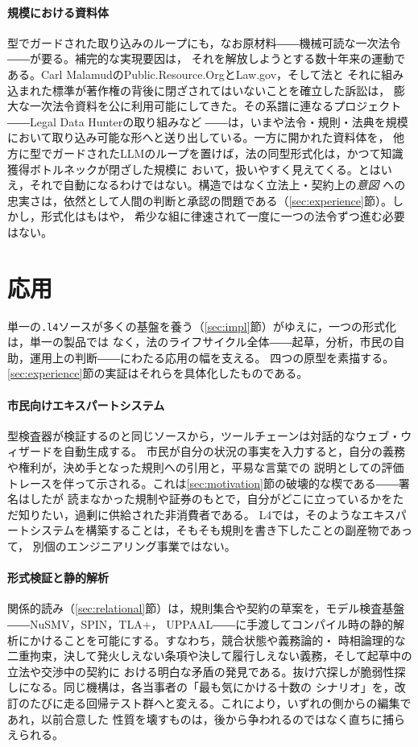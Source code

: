 \documentclass[11pt,a4paper]{ltjsarticle}
\newcommand{\code}[1]{\texttt{\small #1}}
\begin{document}
\paragraph{規模における資料体}
型でガードされた取り込みのループにも，なお原材料――機械可読な一次法令――が要る。補完的な実現要因は，
それを解放しようとする数十年来の運動である。Carl MalamudのPublic.Resource.OrgとLaw.gov，そして法と
それに組み込まれた標準が著作権の背後に閉ざされてはいないことを確立した訴訟\cite{publicresource}は，
膨大な一次法令資料を公に利用可能にしてきた。その系譜に連なるプロジェクト――Legal Data Hunterの取り組みなど
――は，いまや法令・規則・法典を規模において取り込み可能な形へと送り出している。一方に開かれた資料体を，
他方に型でガードされたLLMのループを置けば，法の同型形式化は，かつて知識獲得ボトルネックが閉ざした規模に
おいて，扱いやすく見えてくる。とはいえ，それで自動になるわけではない。構造ではなく立法上・契約上の\emph{意図}
への忠実さは，依然として人間の判断と承認の問題である（\ref{sec:experience}節）。しかし，形式化はもはや，
希少な組に律速されて一度に一つの法令ずつ進む必要はない。

\section{応用}\label{sec:apps}
単一の\code{.l4}ソースが多くの基盤を養う（\ref{sec:impl}節）がゆえに，一つの形式化は，単一の製品では
なく，法のライフサイクル全体――起草，分析，市民の自助，運用上の判断――にわたる応用の幅を支える。
四つの原型を素描する。\ref{sec:experience}節の実証はそれらを具体化したものである。

\paragraph{市民向けエキスパートシステム}
型検査器が検証するのと同じソースから，ツールチェーンは対話的なウェブ・ウィザードを自動生成する。
市民が自分の状況の事実を入力すると，自分の義務や権利が，決め手となった規則への引用と，平易な言葉での
説明としての評価トレースを伴って示される。これは\ref{sec:motivation}節の破壊的な楔である――署名はしたが
読まなかった規制や証券のもとで，自分がどこに立っているかをただ知りたい，過剰に供給された非消費者である。
L4では，そのようなエキスパートシステムを構築することは，そもそも規則を書き下したことの副産物であって，
別個のエンジニアリング事業ではない。

\paragraph{形式検証と静的解析}
関係的読み（\ref{sec:relational}節）は，規則集合や契約の草案を，モデル検査基盤――NuSMV，SPIN，TLA+，
UPPAAL――に手渡してコンパイル時の静的解析にかけることを可能にする。すなわち，競合状態や義務論的・
時相論理的な二重拘束，決して発火しえない条項や決して履行しえない義務，そして起草中の立法や交渉中の契約に
おける明白な矛盾の発見である。抜け穴探しが脆弱性探しになる。同じ機構は，各当事者の「最も気にかける十数の
シナリオ」を，改訂のたびに走る回帰テスト群へと変える。これにより，いずれの側からの編集であれ，以前合意した
性質を壊すものは，後から争われるのではなく直ちに捕らえられる。
\end{document}
